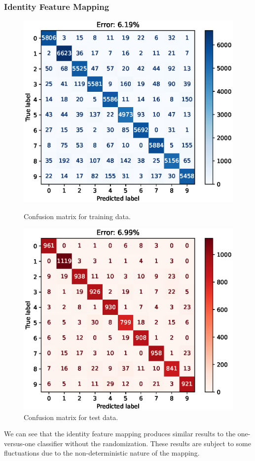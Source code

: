 \documentclass{article}
\begin{document}
\subsubsection{Identity Feature Mapping}
\begin{figure}[h!]
    \centering
    \begin{minipage}{0.5\textwidth}
        \centering
        \includegraphics[width=\textwidth]{images/one_vs_one_training_confusion_matrix_Identity.eps}
        \caption{Confusion matrix for training data.}
    \end{minipage}\hfill
    \begin{minipage}{0.5\textwidth}
        \centering
        \includegraphics[width=\textwidth]{images/one_vs_one_test_confusion_matrix_Identity.eps}
        \caption{Confusion matrix for test data.}
    \end{minipage}
\end{figure}
We can see that the identity feature mapping produces similar results to the one-versus-one classifier without the randomization.
These results are subject to some fluctuations due to the non-deterministic nature of the mapping.
\end{document}
